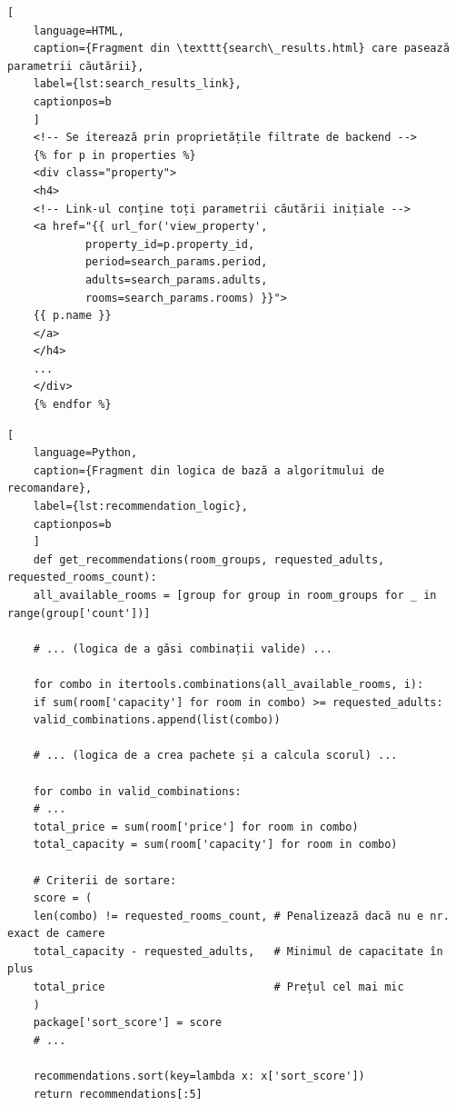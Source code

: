 \documentclass[12pt, a4paper, oneside, romanian]{teza-upb}
\begin{document}
\begin{lstlisting}[
	language=HTML,
	caption={Fragment din \texttt{search\_results.html} care pasează parametrii căutării},
	label={lst:search_results_link},
	captionpos=b
	]
	<!-- Se iterează prin proprietățile filtrate de backend -->
	{% for p in properties %}
	<div class="property">
	<h4>
	<!-- Link-ul conține toți parametrii căutării inițiale -->
	<a href="{{ url_for('view_property', 
			property_id=p.property_id, 
			period=search_params.period, 
			adults=search_params.adults, 
			rooms=search_params.rooms) }}">
	{{ p.name }}
	</a>
	</h4>
	...
	</div>
	{% endfor %}
\end{lstlisting}

\begin{lstlisting}[
	language=Python,
	caption={Fragment din logica de bază a algoritmului de recomandare},
	label={lst:recommendation_logic},
	captionpos=b
	]
	def get_recommendations(room_groups, requested_adults, requested_rooms_count):
	all_available_rooms = [group for group in room_groups for _ in range(group['count'])]
	
	# ... (logica de a găsi combinații valide) ...
	
	for combo in itertools.combinations(all_available_rooms, i):
	if sum(room['capacity'] for room in combo) >= requested_adults:
	valid_combinations.append(list(combo))
	
	# ... (logica de a crea pachete și a calcula scorul) ...
	
	for combo in valid_combinations:
	# ...
	total_price = sum(room['price'] for room in combo)
	total_capacity = sum(room['capacity'] for room in combo)
	
	# Criterii de sortare:
	score = (
	len(combo) != requested_rooms_count, # Penalizează dacă nu e nr. exact de camere
	total_capacity - requested_adults,   # Minimul de capacitate în plus
	total_price                          # Prețul cel mai mic
	)
	package['sort_score'] = score
	# ...
	
	recommendations.sort(key=lambda x: x['sort_score'])
	return recommendations[:5]
\end{lstlisting}
\end{document}
